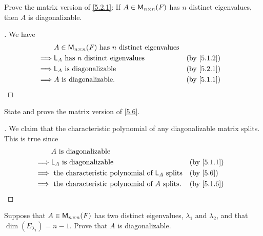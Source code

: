 \exercisesection

\setcounter{ex}{3}
\begin{ex}\label{ex:5.2.4}
  Prove the matrix version of \cref{5.2.1}:
  If \(A \in \ms[n][n][\F]\) has \(n\) distinct eigenvalues, then \(A\) is diagonalizable.
\end{ex}

\begin{proof}[]
  We have
  \begin{align*}
             & A \in \ms[n][n][\F] \text{ has } n \text{ distinct  eigenvalues}                 \\
    \implies & \L_A \text{ has } n \text{ distinct  eigenvalues}                &  & \by{5.1.2} \\
    \implies & \L_A \text{ is diagonalizable}                                   &  & \by{5.2.1} \\
    \implies & A \text{ is diagonalizable}.                                     &  & \by{5.1.1}
  \end{align*}
\end{proof}

\begin{ex}\label{ex:5.2.5}
  State and prove the matrix version of \cref{5.6}.
\end{ex}

\begin{proof}[]
  We claim that the characteristic polynomial of any diagonalizable matrix splits.
  This is true since
  \begin{align*}
             & A \text{ is diagonalizable}                                                   \\
    \implies & \L_A \text{ is diagonalizable}                                &  & \by{5.1.1} \\
    \implies & \text{ the characteristic polynomial of } \L_A \text{ splits} &  & \by{5.6}   \\
    \implies & \text{ the characteristic polynomial of } A \text{ splits}.   &  & \by{5.1.6}
  \end{align*}
\end{proof}

\setcounter{ex}{7}
\begin{ex}\label{ex:5.2.8}
  Suppose that \(A \in \ms[n][n][\F]\) has two distinct eigenvalues, \(\lambda_1\) and \(\lambda_2\), and that \(\dim(E_{\lambda_1}) = n - 1\).
  Prove that \(A\) is diagonalizable.
\end{ex}

